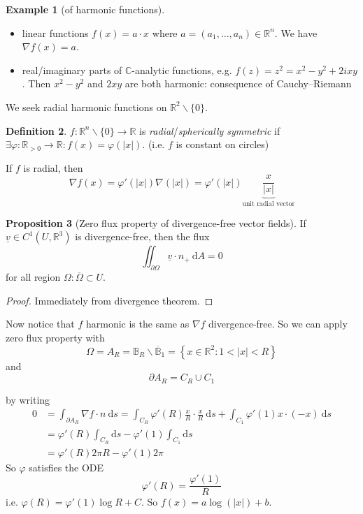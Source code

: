 \documentclass[a4paper]{article}
\theoremstyle{definition}
\newtheorem{defn}{Definition}[subsection]
\newtheorem{prop}[defn]{Proposition}
\newtheorem{eg}[defn]{Example}
\begin{document}
\begin{eg}[of harmonic functions]
\begin{itemize}
    \item linear functions $f(x) = a\cdot x$ where $a=(a_1,\ldots,a_n) \in \mathbb R^n$. We have $\nabla f(x)=a$.
    \item real/imaginary parts of $\mathbb C$-analytic functions, e.g. $f(z)=z^2=x^2-y^2+2ixy$. Then $x^2-y^2$ and $2xy$ are both harmonic: consequence of Cauchy–Riemann
\end{itemize}
\end{eg}
We seek radial harmonic functions on $\mathbb R^2\backslash \{0\}$.
\begin{defn}
$f:\mathbb R^n \backslash \{0\} \rightarrow \mathbb R$ is \textit{radial}/\textit{spherically symmetric} if $\exists \varphi:\mathbb R_{>0} \rightarrow \mathbb R: f(x) = \varphi (|x|)$. (i.e. $f$ is constant on circles)
\end{defn}
If $f$ is radial, then
\[
\nabla f(x) = \varphi'(|x|) \nabla (|x|) = \varphi' (|x|) \underbrace{\frac{x}{|x|}}_{\text{unit radial vector}}
\]
\begin{prop}[Zero flux property of divergence-free vector fields] 
If $\underline v \in C^1 (U,\mathbb R^3)$ is divergence-free, then the flux
\[
\iint_{\partial \Omega} \underline v \cdot n_+ \ \mathrm d A=0
\]
for all region $\Omega:\overline{\Omega}\subset U$.
\end{prop}
\begin{proof}
Immediately from divergence theorem.
\end{proof}
Now notice that $f$ harmonic is the same as $\nabla f$ divergence-free. So we can apply zero flux property with
\[
\Omega = A_R = \mathbb B_R \backslash \overline{\mathbb B}_1 = \left\{ x\in \mathbb R^2 : 1 <|x| <R \right\}
\]
and
\[
\partial A_R = C_R \cup C_1
\]
\begin{center}
\end{center}
by writing
\[
\begin{aligned}
0&=\int_{\partial A_R} \nabla f \cdot n \ \mathrm d s = \int_{C_R} \varphi'(R) \frac{x}{R} \cdot \frac{x}{R} \ \mathrm d s + \int_{C_1} \varphi'(1) x \cdot (-x) \ \mathrm d s \\
&=\varphi'(R) \int_{C_R} \mathrm d s - \varphi'(1) \int_{C_1} \mathrm d s \\
&= \varphi'(R) 2\pi R-\varphi'(1) 2\pi
\end{aligned}
\]
So $\varphi$ satisfies the ODE
\[
\varphi'(R) = \frac{\varphi'(1)}{R}
\]
i.e. $\varphi(R) = \varphi'(1) \log R+C$. So $f(x) = a\log (|x|)+b$.
\end{document}
